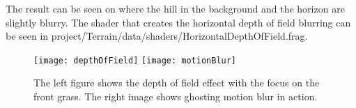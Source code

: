 
The result can be seen on  where the hill in
the background and the horizon are slightly blurry. The shader that
creates the horizontal depth of field blurring can be seen in
project/Terrain/data/shaders/HorizontalDepthOfField.frag.

\begin{figure}
  \label{fig:dofMotionBlur}
  \centering
  \texttt{[image: depthOfField]}
  \texttt{[image: motionBlur]}
  \caption{The left figure shows the depth of field effect with the
    focus on the front grass. The right image shows ghosting motion
    blur in action.}
\end{figure}



